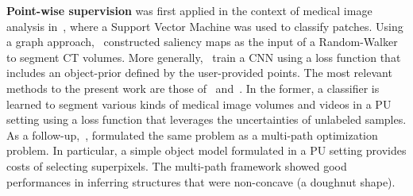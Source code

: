 \textbf{Point-wise supervision} was first applied in the context of medical image analysis in~\cite{vilarino2007}, where a Support Vector Machine was used to classify patches. Using a graph approach,~\cite{khosravan16} constructed saliency maps as the input of a Random-Walker to segment CT volumes. More generally,~\cite{bearman16} train a CNN using a loss function that includes an object-prior defined by the user-provided points. The most relevant methods to the present work are those of~\cite{lejeune17} and~\cite{lejeune18}. In the former, a classifier is learned to segment various kinds of medical image volumes and videos in a PU setting using a loss function that leverages the uncertainties of unlabeled samples. As a follow-up,~\cite{lejeune18}, formulated the same problem as a multi-path optimization problem. In particular, a simple object model formulated in a PU setting provides costs of selecting superpixels. The multi-path framework showed good performances in inferring structures that were non-concave (\eg a doughnut shape).

